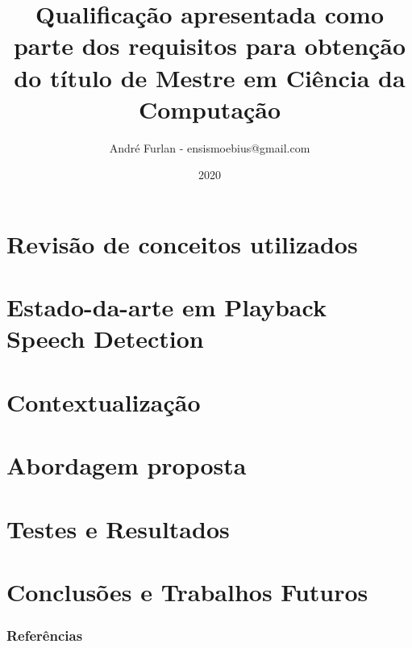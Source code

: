 

\title{Qualificação apresentada como parte dos requisitos para obtenção do título de Mestre em Ciência da Computação}
\author{André Furlan - ensismoebius@gmail.com}
\date{2020}


	
	\frame{\titlepage}
		

	\section{Revisão de conceitos utilizados}
		
		
		
		
		
		
		
	
	\section{Estado-da-arte em Playback Speech Detection}
		
		
	\section{Contextualização}
		

	\section{Abordagem proposta}
		
		
		
		
	\section{Testes e Resultados}
		
		
		
			
		
	\section{Conclusões e Trabalhos Futuros}
		
	
	\begin{frame}[allowframebreaks]
		\frametitle{Referências}
		
	\end{frame}
	
